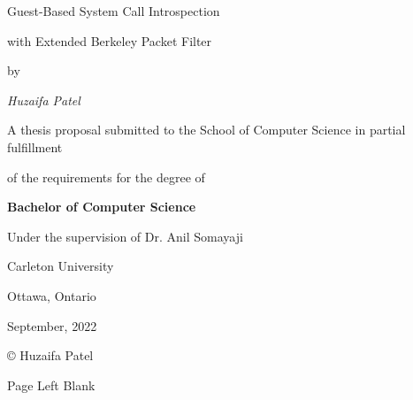 \documentclass{report}
\begin{document}
\titleformat{\chapter}{}{}{0em}{\bf\LARGE}


\centerline{\Huge Guest-Based System Call Introspection}
\vspace{3mm}
\centerline{\Huge with Extended Berkeley Packet Filter}
\vspace{14mm}
\centerline{\large by}
\vspace{15mm}
\centerline{\itshape \large Huzaifa Patel}
\vspace{2cm}
\centerline{\large A thesis proposal submitted to the School of Computer Science in partial fulfillment}
\vspace{2mm}
\centerline{\large of the requirements for the degree of}
\vspace{2cm}
\centerline{\bf \large Bachelor of Computer Science}
\vspace{3cm}
\centerline{\large Under the supervision of Dr. Anil Somayaji}
\vspace{3mm}
\centerline{\large Carleton University}
\vspace{3mm}
\centerline{\large Ottawa, Ontario}
\vspace{3mm}
\centerline{\large September, 2022}
\vspace{3cm}
\centerline{\large \copyright {} Huzaifa Patel}



\newpage
\pagebreak
\hspace{0pt}
\vfill
Page Left Blank
\hspace{0pt}
\pagebreak
\end{document}
